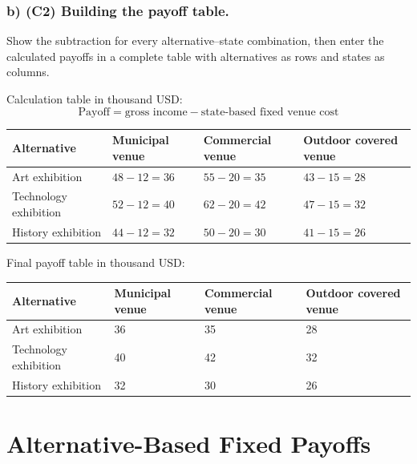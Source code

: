 \subsubsection*{b) \textbf{(C2)} Building the payoff table.}
\label{subsec:problem8-town-exhibition-plan-c2}
Show the subtraction for every alternative--state combination, then enter the calculated payoffs in a complete table with alternatives as rows and states as columns.

Calculation table in thousand USD:
\[
\text{Payoff}=\text{gross income}-\text{state-based fixed venue cost}
\]
\begin{center}
\small
\begin{tabular}{llll}
\toprule
Alternative & Municipal venue & Commercial venue & Outdoor covered venue \\
\midrule
Art exhibition & $48 - 12 = 36$ & $55 - 20 = 35$ & $43 - 15 = 28$ \\
Technology exhibition & $52 - 12 = 40$ & $62 - 20 = 42$ & $47 - 15 = 32$ \\
History exhibition & $44 - 12 = 32$ & $50 - 20 = 30$ & $41 - 15 = 26$ \\
\bottomrule
\end{tabular}
\end{center}

Final payoff table in thousand USD:
\begin{center}
\begin{tabular}{llll}
\toprule
Alternative & Municipal venue & Commercial venue & Outdoor covered venue \\
\midrule
Art exhibition & 36 & 35 & 28 \\
Technology exhibition & 40 & 42 & 32 \\
History exhibition & 32 & 30 & 26 \\
\bottomrule
\end{tabular}
\end{center}
\section{Alternative-Based Fixed Payoffs}
\label{sec:alternative-based-fixed-payoffs}

